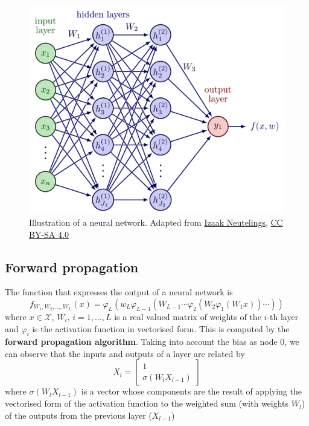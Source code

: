 \begin{figure}
    \centering
    \includegraphics[width=0.8\linewidth]{img/img-ch1/NN.png}
    \caption{Illustration of a neural network. Adapted from \href{https://tikz.net/neural_networks/}{Izaak Neutelings}, \href{https://creativecommons.org/licenses/by-sa/4.0/}{CC BY-SA 4.0}}
    \label{fig:neural_network}
\end{figure}

\subsection{Forward propagation}
The function that expresses the output of a neural network is
\begin{equation}
    f_{W_1, W_2,..., W_L}(x) = \varphi_L(w_L \varphi_{L-1}(W_{L-1} \cdots \varphi_2(W_2 \varphi_1(W_1 x) ) \cdots ) )
\end{equation}
where $x \in\mathcal{X}$, $W_i, \, i=1,...,L$ is a real valued matrix of weights of the $i$-th layer and $\varphi_i$ is the activation function in vectorised form. This is computed by the \textbf{forward propagation algorithm}. Taking into account the bias as node 0, we can observe that the inputs and outputs of a layer are related by
\begin{equation}
    X_l = \begin{bmatrix}
        1 \\
        \sigma(W_l X_{l-1})
    \end{bmatrix} 
\end{equation}
where $\sigma(W_l X_{l-1})$ is a vector whose components are the result of applying the vectorised form of the activation function to the weighted sum (with weights $W_l$) of the outputs from the previous layer ($X_{l-1}$)

